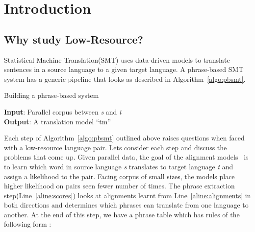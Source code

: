 
%
%

\chapter{Introduction}
\label{sec:introduction}

\section{Why study Low-Resource?}
\label{sec:low_resource}
Statistical Machine Translation(SMT) uses data-driven models to translate sentences in a source language to a given target language. A phrase-based SMT system has a generic pipeline that looks as described in Algorithm~\ref{algo:pbsmt}. 

\begin{algorithm}
\small
\caption{Building a phrase-based system}
\label{algo:pbsmt}
\textbf{Input}: Parallel corpus between \emph{s} and \emph{t} \\
\textbf{Output}: A translation model ``tm'' 
\begin{algorithmic}[l]
	 \label{aline:alignments}
	 \label{aline:scores}
	 \label{aline:MERT}
\end{algorithmic}
\end{algorithm}

Each step of Algorithm~\ref{algo:pbsmt} outlined above raises questions when faced with a low-resource language pair. Lets consider each step and discuss the problems that come up. Given parallel data, the goal of the alignment models~\cite{Brown:1993,Vogel:1996} is to learn which word in source language \emph{s} translates to target language \emph{t} and assign a likelihood to the pair. Facing corpus of small sizes, the models place higher likelihood on pairs seen fewer number of times. The phrase extraction step(Line~\ref{aline:scores}) looks at alignments learnt from Line~\ref{aline:alignments} in both directions and determines which phrases can translate from one language to another. At the end of this step, we have a phrase table which has rules of the following form : 

